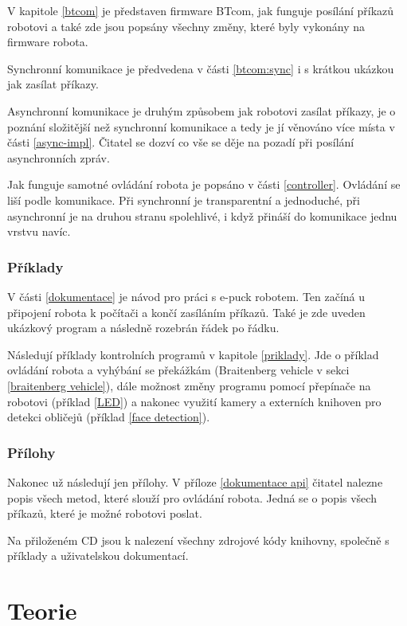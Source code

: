 \documentclass[12pt,notitlepage]{report}
\begin{document}
    V kapitole \ref{btcom} je představen firmware BTcom, jak funguje posílání
    příkazů robotovi a také zde jsou popsány všechny změny, které byly vykonány
    na firmware robota.

    Synchronní komunikace je předvedena v části \ref{btcom:sync} i s krátkou
    ukázkou jak zasílat příkazy.

    Asynchronní komunikace je druhým způsobem jak robotovi zasílat příkazy, je
    o poznání složitější než synchronní komunikace a tedy je jí věnováno více
    místa v části \ref{async-impl}. Čitatel se dozví co vše se děje na pozadí
    při posílání asynchronních zpráv.

    Jak funguje samotné ovládání robota je popsáno v části \ref{controller}.
    Ovládání se liší podle komunikace. Při synchronní je transparentní a
    jednoduché, při asynchronní je na druhou stranu spolehlivé, i když přináší
    do komunikace jednu vrstvu navíc.

    \subsection{Příklady}

    V části \ref{dokumentace} je návod pro práci s e-puck robotem. Ten začíná u
    připojení robota k počítači a končí zasíláním příkazů. Také je zde uveden
    ukázkový program a následně rozebrán řádek po řádku.

    Následují příklady kontrolních programů v kapitole \ref{priklady}. Jde o
    příklad ovládání robota a vyhýbání se překážkám (Braitenberg vehicle v
    sekci \ref{braitenberg vehicle}), dále možnost změny programu pomocí
    přepínače na robotovi (příklad \ref{LED}) a nakonec využití kamery a
    externích knihoven pro detekci obličejů (příklad \ref{face detection}).

    \subsection{Přílohy}

    Nakonec už následují jen přílohy. V příloze \ref{dokumentace api} čitatel
    nalezne popis všech metod, které slouží pro ovládání robota. Jedná se o
    popis všech příkazů, které je možné robotovi poslat.

    Na přiloženém CD jsou k nalezení všechny zdrojové kódy knihovny, společně s
    příklady a uživatelskou dokumentací.

\chapter{Teorie} %
\end{document}
